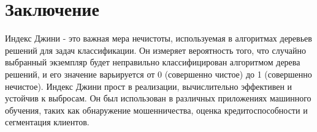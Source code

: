 \documentclass{article}
\begin{document}
\section*{Заключение}
Индекс Джини - это важная мера нечистоты, используемая в алгоритмах деревьев решений для задач классификации. Он измеряет вероятность того, что случайно выбранный экземпляр будет неправильно классифицирован алгоритмом дерева решений, и его значение варьируется от 0 (совершенно чистое) до 1 (совершенно нечистое). Индекс Джини прост в реализации, вычислительно эффективен и устойчив к выбросам. Он был использован в различных приложениях машинного обучения, таких как обнаружение мошенничества, оценка кредитоспособности и сегментация клиентов.
\end{document}
